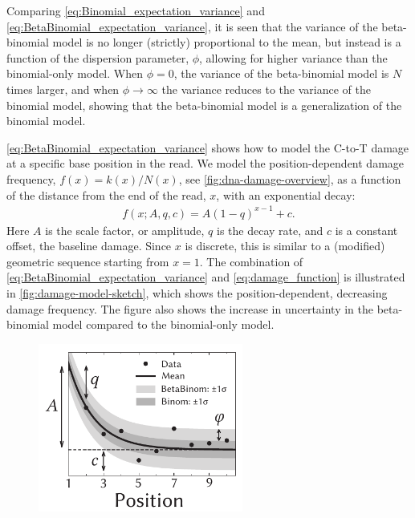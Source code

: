 Comparing \autoref{eq:Binomial_expectation_variance} and \autoref{eq:BetaBinomial_expectation_variance}, it is seen that the variance of the beta-binomial model is no longer (strictly) proportional to the mean, but instead is a function of the dispersion parameter, $\phi$, allowing for higher variance than the binomial-only model. When $\phi = 0$, the variance of the beta-binomial model is $N$ times larger, and when $\phi \rightarrow \infty$ the variance reduces to the variance of the binomial model, showing that the beta-binomial model is a generalization of the binomial model.

\autoref{eq:BetaBinomial_expectation_variance} shows how to model the C-to-T damage at a specific base position in the read. We model the position-dependent damage frequency, $f(x) = k(x) / N(x)$, see \autoref{fig:dna-damage-overview}, as a function of the distance from the end of the read, $x$, with an exponential decay:
\begin{align}
    f(x; A, q, c) = A(1-q)^{x-1} + c.
    \label{eq:damage_function}
\end{align}
Here $A$ is the scale factor, or amplitude, $q$ is the decay rate, and $c$ is a constant offset, the baseline damage. Since $x$ is discrete, this is similar to a (modified) geometric sequence starting from $x=1$. The combination of \autoref{eq:BetaBinomial_expectation_variance} and \autoref{eq:damage_function} is illustrated in \autoref{fig:damage-model-sketch}, which shows the position-dependent, decreasing damage frequency. The figure also shows the increase in uncertainty in the beta-binomial model compared to the binomial-only model.
\begin{figure}[htbp]
    \centering
    \includegraphics[width=0.6\textwidth]{figures/damage_sketch_new.pdf}
\end{figure}

